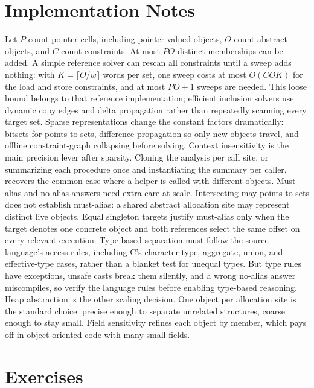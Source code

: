 \section{Implementation Notes}
\label{sec:ch20-implementation}

Let $P$ count pointer cells, including pointer-valued objects, $O$ count abstract objects, and $C$ count constraints.
At most $PO$ distinct memberships can be added.
A simple reference solver can rescan all constraints until a sweep adds nothing: with $K=\lceil O/w\rceil$ words per set, one sweep costs at most $O(COK)$ for the load and store constraints, and at most $PO+1$ sweeps are needed.
This loose bound belongs to that reference implementation; efficient inclusion solvers use dynamic copy edges and delta propagation rather than repeatedly scanning every target set.
Sparse representations change the constant factors dramatically: bitsets for points-to sets, difference propagation so only new objects travel, and offline constraint-graph collapsing before solving.
Context insensitivity is the main precision lever after sparsity.
Cloning the analysis per call site, or summarizing each procedure once and instantiating the summary per caller, recovers the common case where a helper is called with different objects.
Must-alias and no-alias answers need extra care at scale.
Intersecting may-points-to sets does not establish must-alias: a shared abstract allocation site may represent distinct live objects.
Equal singleton targets justify must-alias only when the target denotes one concrete object and both references select the same offset on every relevant execution.
Type-based separation must follow the source language's access rules, including C's character-type, aggregate, union, and effective-type cases, rather than a blanket test for unequal types.
But type rules have exceptions, unsafe casts break them silently, and a wrong no-alias answer miscompiles, so verify the language rules before enabling type-based reasoning.
Heap abstraction is the other scaling decision.
One object per allocation site is the standard choice: precise enough to separate unrelated structures, coarse enough to stay small.
Field sensitivity refines each object by member, which pays off in object-oriented code with many small fields.

\section{Exercises}
\label{sec:ch20-exercises}

